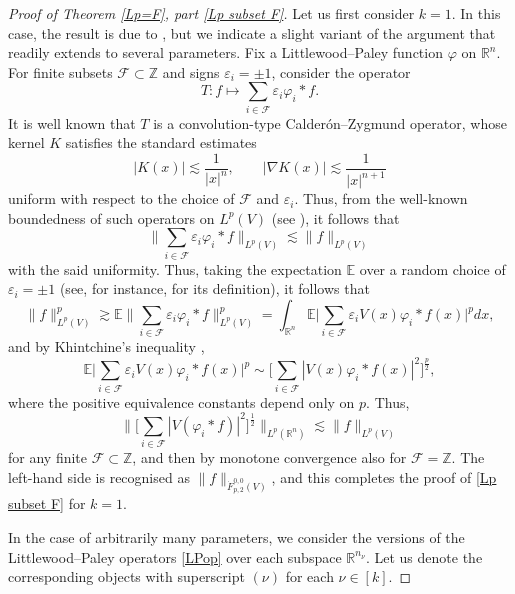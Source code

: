 \documentclass[11pt, reqno]{amsart}
\theoremstyle{definition}
\theoremstyle{remark}
\numberwithin{equation}{section}
\newcommand{\E}{\mathbb E}
\newcommand{\Fs}{\mathscr F}
\newcommand{\R}{\mathbb R}
\newcommand{\Z}{\mathbb Z}
\newcommand{\eps}{\varepsilon}
\newcommand{\abs}[1]{|#1|}
\newcommand{\Babs}[1]{\Big|#1\Big|}
\newcommand{\Norm}[2]{\|#1\|_{#2}}
\newcommand{\BNorm}[2]{\Big\|#1\Big\|_{#2}}
\begin{document}
\begin{proof}[Proof of Theorem \ref{Lp=F}, part \eqref{Lp subset F}]
Let us first consider $k=1$. In this case, the result is due to \cite[Theorem 4.1]{FR21}, but we indicate a slight variant of the argument that readily extends to several parameters.  Fix a Littlewood--Paley function $\varphi$ on $\R^{n}$. For finite subsets $\Fs\subset\Z$ and signs $\eps_i=\pm 1$, consider the operator
\begin{equation}\label{LPop}
T: f\mapsto\sum_{i\in\Fs}\eps_i\varphi_i*f.
\end{equation}
It is well known that $T$ is a convolution-type Calder\'on--Zygmund operator, whose kernel $K$ satisfies the standard estimates
\begin{equation*}
\abs{K(x)}\lesssim\frac{1}{\abs{x}^n},\qquad\abs{\nabla K(x)}\lesssim\frac{1}{\abs{x}^{n+1}}
\end{equation*}
uniform with respect to the choice of $\Fs$ and $\eps_i$. Thus, from the well-known boundedness of such operators on $L^p(V)$ (see \cite[Theorem 5.1]{Gold03}), it follows that
\begin{equation*}
\BNorm{\sum_{i\in\Fs}\eps_i\varphi_i*f}{L^p(V)}\lesssim\Norm{f}{L^p(V)}
\end{equation*}
with the said uniformity. Thus, taking the expectation $\E$ over a random choice of $\eps_i=\pm 1$
(see, for instance, \cite[p.\,73]{HNVW1} for its definition), it follows that
\begin{equation*}
\Norm{f}{L^p(V)}^p\gtrsim\E\BNorm{\sum_{i\in\Fs}\eps_i\varphi_i*f}{L^p(V)}^p
=\int_{\R^n}\E\Babs{\sum_{i\in\Fs}\eps_i V(x)\varphi_i*f(x)}^p dx,
\end{equation*}
and by Khintchine's inequality \cite[Sections C.2--C.3]{Graf-clas},
\begin{equation*}
\E\Babs{\sum_{i\in\Fs}\eps_i V(x)\varphi_i*f(x)}^p
\sim \Big[ \sum_{i\in\Fs}\abs{V(x)\varphi_i*f(x)}^2 \Big]^{\frac{p}{2}},
\end{equation*}
where the positive equivalence constants depend only on $p$.
Thus,
\begin{equation*}
\Big\|\Big[\sum_{i\in\Fs}\abs{V(\varphi_i*f)}^2\Big]^{\frac{1}{2}}
\Big\|_{L^p(\R^n)}
\lesssim\Norm{f}{L^p(V)}
\end{equation*}
for any finite $\Fs\subset\Z$, and then by monotone convergence also for $\Fs=\Z$. The left-hand side is recognised as $\Norm{f}{\dot F^{0,0}_{p,2}(V)}$, and this completes the proof of \eqref{Lp subset F} for $k=1$.

In the case of arbitrarily many parameters, we consider the versions of the Littlewood--Paley operators \eqref{LPop} over each subspace $\R^{n_\nu}$. Let us denote the corresponding objects with superscript $(\nu)$ for each $\nu\in[k]$.


\end{proof}
\end{document}
